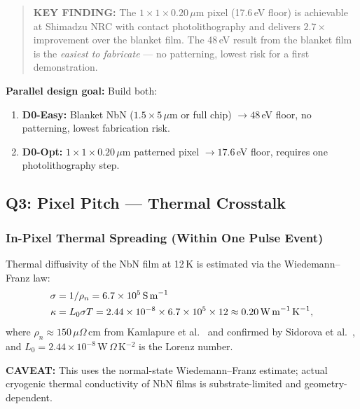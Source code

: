 \begin{quote}
\textbf{KEY FINDING:}
The $1 \times 1 \times 0.20\,\mu$m pixel (17.6\,eV floor) is achievable at
Shimadzu NRC with contact photolithography and delivers $2.7\times$ improvement
over the blanket film. The 48\,eV result from the blanket film is the \emph{easiest
to fabricate} --- no patterning, lowest risk for a first demonstration.
\end{quote}

\textbf{Parallel design goal:} Build both:
\begin{enumerate}
  \item \textbf{D0-Easy:} Blanket NbN ($1.5 \times 5\,\mu$m or full chip)
    $\to 48$\,eV floor, no patterning, lowest fabrication risk.
  \item \textbf{D0-Opt:} $1 \times 1 \times 0.20\,\mu$m patterned pixel
    $\to 17.6$\,eV floor, requires one photolithography step.
\end{enumerate}

\subsection{Q3: Pixel Pitch --- Thermal Crosstalk}
\label{sec:q3}

\subsubsection{In-Pixel Thermal Spreading (Within One Pulse Event)}
\label{sec:q3_intra}

Thermal diffusivity of the NbN film at 12\,K is estimated via the Wiedemann--Franz law:
\begin{align}
  \sigma &= 1/\rho_n = 6.7 \times 10^5\,\text{S\,m}^{-1} \notag \\
  \kappa &= L_0 \sigma T = 2.44 \times 10^{-8} \times 6.7 \times 10^5 \times 12
           \approx 0.20\,\text{W\,m}^{-1}\,\text{K}^{-1},
  \label{eq:q3_kappa_WF}
\end{align}
where $\rho_n \approx 150\,\mu\Omega$\,cm from Kamlapure et al.~\cite{Kamlapure2010}
and confirmed by Sidorova et al.~\cite{Sidorova2020}, %
and $L_0 = 2.44 \times 10^{-8}$\,W\,$\Omega$\,K$^{-2}$ is the Lorenz number.

\textbf{CAVEAT:} This uses the normal-state Wiedemann--Franz estimate; actual
cryogenic thermal conductivity of NbN films is substrate-limited and
geometry-dependent.

